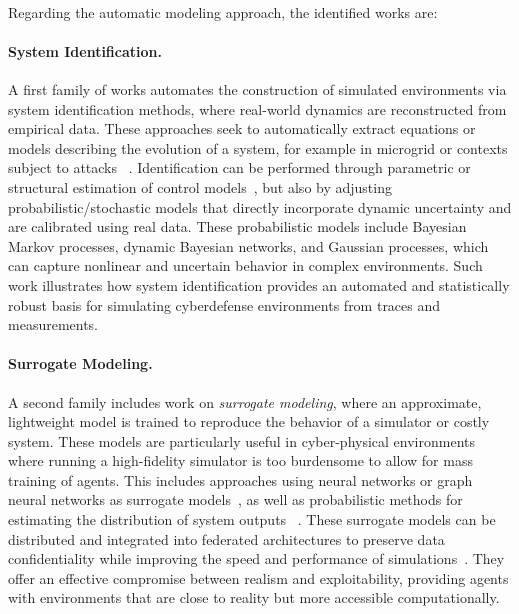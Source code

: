 \

Regarding the automatic modeling approach, the identified works are:

\paragraph{System Identification.}
A first family of works automates the construction of simulated environments via system identification methods, where real-world dynamics are reconstructed from empirical data. These approaches seek to automatically extract equations or models describing the evolution of a system, for example in microgrid or  contexts subject to attacks~\cite{NtDvjag65BgJ, tBI-_piWs1cJ} . Identification can be performed through parametric or structural estimation of control models~\cite{g5PxHs45ZtYJ}, but also by adjusting probabilistic/stochastic models that directly incorporate dynamic uncertainty and are calibrated using real data. These probabilistic models include Bayesian Markov processes, dynamic Bayesian networks, and Gaussian processes, which can capture nonlinear and uncertain behavior in complex environments. Such work illustrates how system identification provides an automated and statistically robust basis for simulating cyberdefense environments from traces and measurements.

\paragraph{Surrogate Modeling.}
A second family includes work on \textit {surrogate modeling}, where an approximate, lightweight model is trained to reproduce the behavior of a simulator or costly system. These models are particularly useful in cyber-physical environments where running a high-fidelity simulator is too burdensome to allow for mass training of agents. This includes approaches using neural networks or graph neural networks as surrogate models~\cite{g4qXIBHVJwUJ, Cr1JpifjcFwJ}, as well as probabilistic methods for estimating the distribution of system outputs~\cite{hPBZHSLGStkJ} . These surrogate models can be distributed and integrated into federated architectures to preserve data confidentiality while improving the speed and performance of simulations~\cite{g4qXIBHVJwUJ}. They offer an effective compromise between realism and exploitability, providing agents with environments that are close to reality but more accessible computationally.

